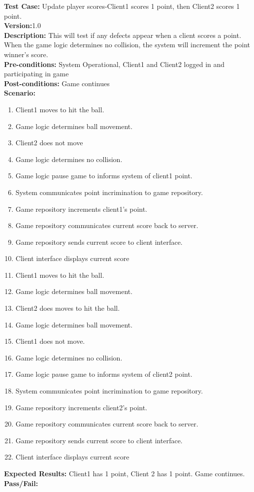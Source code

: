\noindent \textbf{Test Case:} Update player scores-Client1 scores 1 point, then Client2 scores 1 point.\\
\textbf{Version:}1.0\\
\textbf{Description:} This will test if any defects appear when a client scores a point.  When the game logic determines no collision, the system will increment the point winner's score.\\
\textbf{Pre-conditions:} System Operational, Client1 and Client2 logged in and participating in game \\
\textbf{Post-conditions:} Game continues\\
\textbf{Scenario:}
\begin{enumerate}
\item Client1 moves to hit the ball.
\item Game logic determines ball movement.
\item Client2 does not move 
\item Game logic determines no collision. 
\item Game logic pause game to informs system of client1 point.
\item System communicates point incrimination to game repository.
\item Game repository increments client1’s point.
\item Game repository communicates current score back to server.
\item Game repository sends current score to client interface.
\item Client interface displays current score
\item Client1 moves to hit the ball.
\item Game logic determines ball movement.
\item Client2 does moves to hit the ball. 
\item Game logic determines ball movement.
\item Client1 does not move.
\item Game logic determines no collision. 
\item Game logic pause game to informs system of client2 point.
\item System communicates point incrimination to game repository.
\item Game repository increments client2’s point.
\item Game repository communicates current score back to server.
\item Game repository sends current score to client interface.
\item Client interface displays current score
\end{enumerate}
\textbf{Expected Results:} Client1 has 1 point, Client 2 has 1 point.  Game continues.\\
\textbf{Pass/Fail:}

